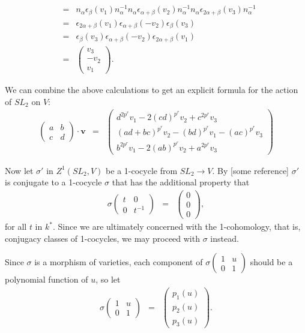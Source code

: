 \begin{eqnarray*}
&=& 
n_ \alpha  \epsilon_\beta (v_1) n_ \alpha^{-1}n_ \alpha \epsilon_{\alpha+\beta}(v_2) n_ \alpha^{-1} n_ \alpha \epsilon_{2\alpha+\beta}(v_3) n_ \alpha^{-1}\\
&=& 
\epsilon_{2\alpha+\beta} (v_1) \epsilon_{\alpha+\beta}(-v_2)  \epsilon_{\beta}(v_3) \\
&=& 
\epsilon_{\beta}(v_3) \epsilon_{\alpha+\beta}(-v_2) \epsilon_{2\alpha+\beta} (v_1)\\
&=& \left(\begin{matrix} v_3 \\ -v_2 \\ v_1 \end{matrix}\right).
\end{eqnarray*}

We can combine the above calculations to get an explicit formula for the action of $SL_2$ on $V$:
\begin{eqnarray*}
\left(\begin{matrix} a & b \\ c & d\end{matrix}\right) \cdot \mathbf{v} &=&
\left(\begin{matrix}
d^{2p^r}v_1 -2(cd)^{p^r}v_2 + c^{2p^r}v_3 \\
(ad + bc)^{p^r}v_2 - (bd)^{p^r}v_1 - (ac)^{p^r}v_3 \\
b^{2p^r}v_1 -2(ab)^{p^r}v_2 + a^{2p^r}v_3
\end{matrix}\right)
\end{eqnarray*}

Now let $\sigma'$ in $Z^1(SL_2, V)$ be a 1-cocycle from $SL_2\rightarrow V$. By [some reference] $\sigma'$ is conjugate to a 1-cocycle $\sigma$ that has the additional property that
\begin{eqnarray*}
\sigma\left( \begin{matrix} t & 0 \\ 0 & t^{-1}\end{matrix}\right) &=& 
\left( \begin{matrix} 0 \\ 0 \\0\end{matrix}\right),
\end{eqnarray*}
for all $t$ in $k^*$. Since we are ultimately concerned with the 1-cohomology, that is, conjugacy classes of 1-cocycles, we may proceed with $\sigma$ instead.

Since $\sigma$ is a morphism of varieties, each component of $\sigma\left(\begin{matrix} 1& u \\ 0 & 1\end{matrix}\right)$ should be a polynomial function of $u$, so let
\begin{eqnarray*}
\sigma\left(\begin{matrix} 1& u \\ 0 & 1\end{matrix}\right) &=&
\left(\begin{matrix} p_1(u) \\ p_2(u) \\ p_3(u) \end{matrix}\right).
\end{eqnarray*}

